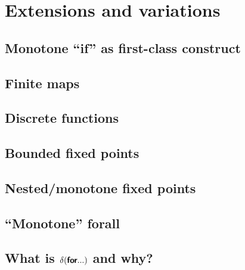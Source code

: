 \chapter{Extensions and variations}

\section{Monotone ``if'' as first-class construct}

\section{Finite maps}
\label{section-finite-maps}


\section{Discrete functions}
\label{section-discrete-functions}


\section{Bounded fixed points}
\label{section-bounded-fixed-points}


\section{Nested/monotone fixed points}
\label{section-nested-fixed-points}


\section{``Monotone'' forall}


\section{What is \texorpdfstring{\boldmath$\delta(\textsf{\bfseries for} ...)$}{\textdelta(for ...)} and why?}

